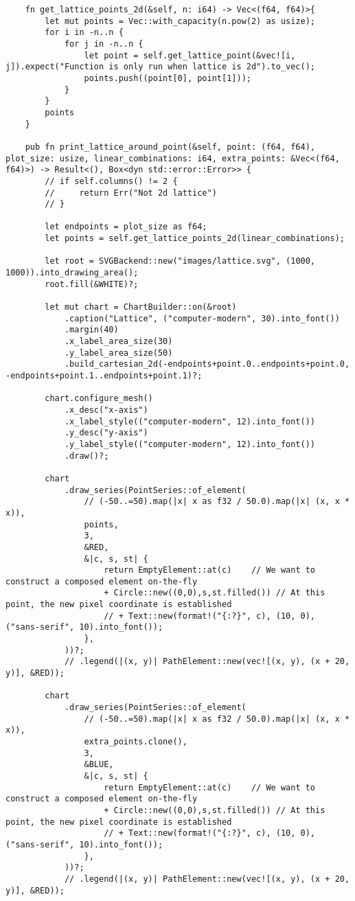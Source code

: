 \begin{verbatim}
    fn get_lattice_points_2d(&self, n: i64) -> Vec<(f64, f64)>{
        let mut points = Vec::with_capacity(n.pow(2) as usize);
        for i in -n..n {
            for j in -n..n {
                let point = self.get_lattice_point(&vec![i, j]).expect("Function is only run when lattice is 2d").to_vec();
                points.push((point[0], point[1]));
            }
        }
        points
    }

    pub fn print_lattice_around_point(&self, point: (f64, f64), plot_size: usize, linear_combinations: i64, extra_points: &Vec<(f64, f64)>) -> Result<(), Box<dyn std::error::Error>> {
        // if self.columns() != 2 {
        //     return Err("Not 2d lattice")
        // }

        let endpoints = plot_size as f64;
        let points = self.get_lattice_points_2d(linear_combinations);

        let root = SVGBackend::new("images/lattice.svg", (1000, 1000)).into_drawing_area();
        root.fill(&WHITE)?;

        let mut chart = ChartBuilder::on(&root)
            .caption("Lattice", ("computer-modern", 30).into_font())
            .margin(40)
            .x_label_area_size(30)
            .y_label_area_size(50)
            .build_cartesian_2d(-endpoints+point.0..endpoints+point.0, -endpoints+point.1..endpoints+point.1)?;

        chart.configure_mesh()
            .x_desc("x-axis")
            .x_label_style(("computer-modern", 12).into_font())
            .y_desc("y-axis")
            .y_label_style(("computer-modern", 12).into_font())
            .draw()?;

        chart
            .draw_series(PointSeries::of_element(
                // (-50..=50).map(|x| x as f32 / 50.0).map(|x| (x, x * x)),
                points,
                3,
                &RED,
                &|c, s, st| {
                    return EmptyElement::at(c)    // We want to construct a composed element on-the-fly
                    + Circle::new((0,0),s,st.filled()) // At this point, the new pixel coordinate is established
                    // + Text::new(format!("{:?}", c), (10, 0), ("sans-serif", 10).into_font());
                },
            ))?;
            // .legend(|(x, y)| PathElement::new(vec![(x, y), (x + 20, y)], &RED));

        chart
            .draw_series(PointSeries::of_element(
                // (-50..=50).map(|x| x as f32 / 50.0).map(|x| (x, x * x)),
                extra_points.clone(),
                3,
                &BLUE,
                &|c, s, st| {
                    return EmptyElement::at(c)    // We want to construct a composed element on-the-fly
                    + Circle::new((0,0),s,st.filled()) // At this point, the new pixel coordinate is established
                    // + Text::new(format!("{:?}", c), (10, 0), ("sans-serif", 10).into_font());
                },
            ))?;
            // .legend(|(x, y)| PathElement::new(vec![(x, y), (x + 20, y)], &RED));


\end{verbatim}
